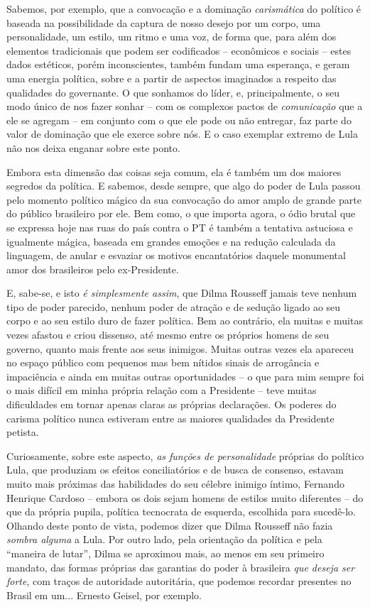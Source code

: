 Sabemos, por exemplo, que a convocação e a dominação \emph{carismática}
do político é baseada na possibilidade da captura de nosso desejo por um
corpo, uma personalidade, um estilo, um ritmo e uma voz, de forma que,
para além dos elementos tradicionais que podem ser codificados --
econômicos e sociais -- estes dados estéticos, porém inconscientes,
também fundam uma esperança, e geram uma energia política, sobre e a
partir de aspectos imaginados a respeito das qualidades do governante. O
que sonhamos do líder, e, principalmente, o seu modo único de nos fazer
sonhar -- com os complexos pactos de \emph{comunicação} que a ele se
agregam -- em conjunto com o que ele pode ou não entregar, faz parte do
valor de dominação que ele exerce sobre nós. E o caso exemplar extremo
de Lula não nos deixa enganar sobre este ponto.

Embora esta dimensão das coisas seja comum, ela é também um dos maiores
segredos da política. E sabemos, desde sempre, que algo do poder de Lula
passou pelo momento político mágico da sua convocação do amor amplo de
grande parte do público brasileiro por ele. Bem como, o que importa
agora, o ódio brutal que se expressa hoje nas ruas do país contra o PT é
também a tentativa astuciosa e igualmente mágica, baseada em grandes
emoções e na redução calculada da linguagem, de anular e esvaziar os
motivos encantatórios daquele monumental amor dos brasileiros pelo
ex-Presidente.

E, sabe-se, e isto \emph{é simplesmente assim}, que Dilma Rousseff
jamais teve nenhum tipo de poder parecido, nenhum poder de atração e de
sedução ligado ao seu corpo e ao seu estilo duro de fazer política. Bem
ao contrário, ela muitas e muitas vezes afastou e criou dissenso, até
mesmo entre os próprios homens de seu governo, quanto mais frente aos
seus inimigos. Muitas outras vezes ela apareceu no espaço público com
pequenos mas bem nítidos sinais de arrogância e impaciência e ainda em
muitas outras oportunidades -- o que para mim sempre foi o mais difícil
em minha própria relação com a Presidente -- teve muitas dificuldades em
tornar apenas claras as próprias declarações. Os poderes do carisma
político nunca estiveram entre as maiores qualidades da Presidente
petista.

Curiosamente, sobre este aspecto, \emph{as funções de personalidade}
próprias do político Lula, que produziam os efeitos conciliatórios e de
busca de consenso, estavam muito mais próximas das habilidades do seu
célebre inimigo íntimo, Fernando Henrique Cardoso -- embora os dois
sejam homens de estilos muito diferentes -- do que da própria pupila,
política tecnocrata de esquerda, escolhida para sucedê-lo. Olhando deste
ponto de vista, podemos dizer que Dilma Rousseff não fazia \emph{sombra
alguma} a Lula. Por outro lado, pela orientação da política e pela
``maneira de lutar'', Dilma se aproximou mais, ao menos em seu primeiro
mandato, das formas próprias das garantias do poder à brasileira
\emph{que deseja ser forte}, com traços de autoridade autoritária, que
podemos recordar presentes no Brasil em um... Ernesto Geisel, por
exemplo.

